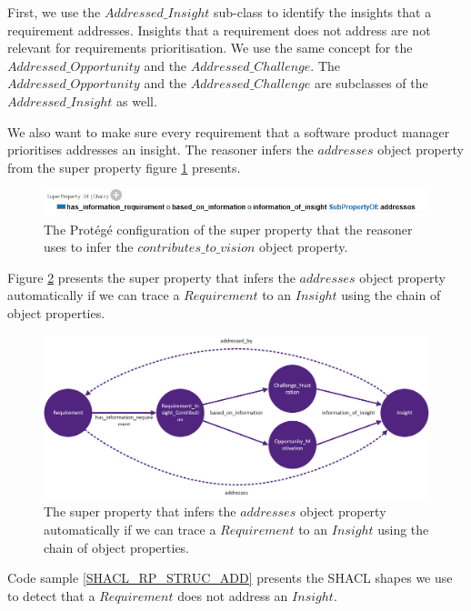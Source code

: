 First, we use the $Addressed\_Insight$ sub-class to identify the insights that a requirement addresses. Insights that a requirement does not address are not relevant for requirements prioritisation. We use the same concept for the $Addressed\_Opportunity$ and the $ Addressed\_Challenge$. The $Addressed\_Opportunity$ and the $Addressed\_Challenge$ are subclasses of the $Addressed\_Insight$ as well. 

We also want to make sure every requirement that a software product manager prioritises addresses an insight. The reasoner infers the $addresses$ object property from the super property figure \ref{fig:05_RP_Addresses} presents.

\begin{figure}[H]
\centering
  \includegraphics[width=17cm]{../../Images/05_Validation/05_RP_Addresses.png}
  \caption{The Prot\'eg\'e configuration of the super property that the reasoner uses to infer the $contributes\_to\_vision$ object property.}
  \label{fig:05_RP_Addresses}
\end{figure}

Figure \ref{fig:addressed_requirement} presents the super property that infers the $addresses$ object property automatically if we can trace a $Requirement$ to an $Insight$ using the chain of object properties.

\begin{figure}[H]
\centering
  \includegraphics[width=15cm]{../../Images/05_Validation/05_RP_Addresses_Overview.png}
  \caption{The super property that infers the $addresses$ object property automatically if we can trace a $Requirement$ to an $Insight$ using the chain of object properties.}
  \label{fig:addressed_requirement}
\end{figure}

Code sample \ref{SHACL_RP_STRUC_ADD} presents the SHACL shapes we use to detect that a $Requirement$ does not address an $Insight$.

